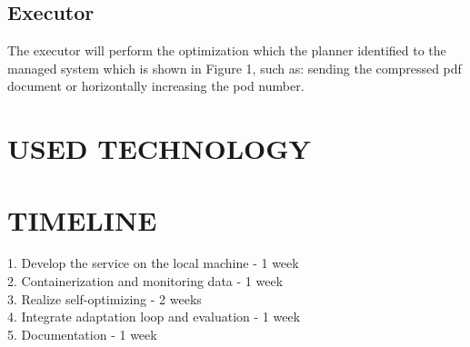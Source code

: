 \documentclass[sigconf]{acmart}
\begin{document}
\subsection{Executor}
The executor will perform the optimization which the planner identified to the managed system which is shown in Figure 1, such as: sending the compressed pdf document or horizontally increasing the pod number.
\section{USED TECHNOLOGY}
\begin{table}[H]
\end{table}



\section{TIMELINE}
1.	Develop the service on the local machine - 1 week\\
2.	Containerization and monitoring data - 1 week\\
3.	Realize self-optimizing - 2 weeks\\
4.	Integrate adaptation loop and evaluation - 1 week\\
5.	Documentation - 1 week



\end{document}
